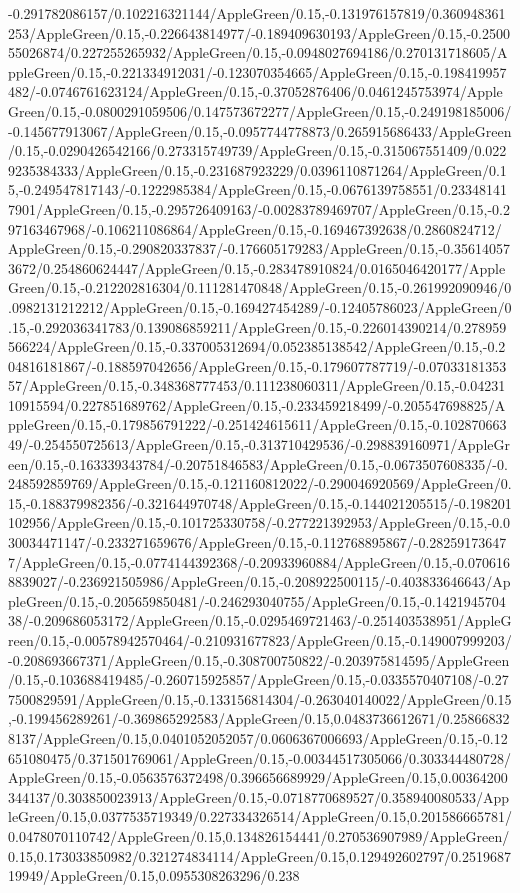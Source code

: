 {\begin{tikzternal}
{-0.291782086157/0.102216321144/AppleGreen/0.15,-0.131976157819/0.360948361253/AppleGreen/0.15,-0.226643814977/-0.189409630193/AppleGreen/0.15,-0.250055026874/0.227255265932/AppleGreen/0.15,-0.0948027694186/0.270131718605/AppleGreen/0.15,-0.221334912031/-0.123070354665/AppleGreen/0.15,-0.198419957482/-0.0746761623124/AppleGreen/0.15,-0.37052876406/0.0461245753974/AppleGreen/0.15,-0.0800291059506/0.147573672277/AppleGreen/0.15,-0.249198185006/-0.145677913067/AppleGreen/0.15,-0.0957744778873/0.265915686433/AppleGreen/0.15,-0.0290426542166/0.273315749739/AppleGreen/0.15,-0.315067551409/0.0229235384333/AppleGreen/0.15,-0.231687923229/0.0396110871264/AppleGreen/0.15,-0.249547817143/-0.1222985384/AppleGreen/0.15,-0.0676139758551/0.233481417901/AppleGreen/0.15,-0.295726409163/-0.00283789469707/AppleGreen/0.15,-0.297163467968/-0.106211086864/AppleGreen/0.15,-0.169467392638/0.2860824712/AppleGreen/0.15,-0.290820337837/-0.176605179283/AppleGreen/0.15,-0.356140573672/0.254860624447/AppleGreen/0.15,-0.283478910824/0.0165046420177/AppleGreen/0.15,-0.212202816304/0.111281470848/AppleGreen/0.15,-0.261992090946/0.0982131212212/AppleGreen/0.15,-0.169427454289/-0.12405786023/AppleGreen/0.15,-0.292036341783/0.139086859211/AppleGreen/0.15,-0.226014390214/0.278959566224/AppleGreen/0.15,-0.337005312694/0.052385138542/AppleGreen/0.15,-0.204816181867/-0.188597042656/AppleGreen/0.15,-0.179607787719/-0.0703318135357/AppleGreen/0.15,-0.348368777453/0.111238060311/AppleGreen/0.15,-0.0423110915594/0.227851689762/AppleGreen/0.15,-0.233459218499/-0.205547698825/AppleGreen/0.15,-0.179856791222/-0.251424615611/AppleGreen/0.15,-0.10287066349/-0.254550725613/AppleGreen/0.15,-0.313710429536/-0.298839160971/AppleGreen/0.15,-0.163339343784/-0.20751846583/AppleGreen/0.15,-0.0673507608335/-0.248592859769/AppleGreen/0.15,-0.121160812022/-0.290046920569/AppleGreen/0.15,-0.188379982356/-0.321644970748/AppleGreen/0.15,-0.144021205515/-0.198201102956/AppleGreen/0.15,-0.101725330758/-0.277221392953/AppleGreen/0.15,-0.030034471147/-0.233271659676/AppleGreen/0.15,-0.112768895867/-0.282591736477/AppleGreen/0.15,-0.0774144392368/-0.20933960884/AppleGreen/0.15,-0.0706168839027/-0.236921505986/AppleGreen/0.15,-0.208922500115/-0.403833646643/AppleGreen/0.15,-0.205659850481/-0.246293040755/AppleGreen/0.15,-0.142194570438/-0.209686053172/AppleGreen/0.15,-0.0295469721463/-0.251403538951/AppleGreen/0.15,-0.00578942570464/-0.210931677823/AppleGreen/0.15,-0.149007999203/-0.208693667371/AppleGreen/0.15,-0.308700750822/-0.203975814595/AppleGreen/0.15,-0.103688419485/-0.260715925857/AppleGreen/0.15,-0.0335570407108/-0.277500829591/AppleGreen/0.15,-0.133156814304/-0.263040140022/AppleGreen/0.15,-0.199456289261/-0.369865292583/AppleGreen/0.15,0.0483736612671/0.258668328137/AppleGreen/0.15,0.0401052052057/0.0606367006693/AppleGreen/0.15,-0.12651080475/0.371501769061/AppleGreen/0.15,-0.00344517305066/0.303344480728/AppleGreen/0.15,-0.0563576372498/0.396656689929/AppleGreen/0.15,0.00364200344137/0.303850023913/AppleGreen/0.15,-0.0718770689527/0.358940080533/AppleGreen/0.15,0.0377535719349/0.227334326514/AppleGreen/0.15,0.201586665781/0.0478070110742/AppleGreen/0.15,0.134826154441/0.270536907989/AppleGreen/0.15,0.173033850982/0.321274834114/AppleGreen/0.15,0.129492602797/0.251968719949/AppleGreen/0.15,0.0955308263296/0.238}
\end{tikzternal}}
